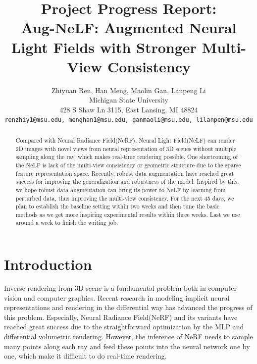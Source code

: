 \documentclass[10pt,twocolumn,letterpaper]{article}
\begin{document}
\title{Project Progress Report: \\Aug-NeLF: Augmented Neural Light Fields with Stronger Multi-View Consistency}

\author{Zhiyuan Ren, Han Meng, Maolin Gan, Lanpeng Li\\
Michigan State University\\
428 S Shaw Ln 3115, East Lansing, MI 48824\\
{\tt\small renzhiy1@msu.edu, menghan1@msu.edu, ganmaoli@msu.edu, lilanpen@msu.edu}
}
\maketitle

\begin{abstract}
   Compared with Neural Radiance Field(NeRF), Neural Light Field(NeLF) can render 2D images with novel views from neural representation of 3D scenes without multiple sampling along the ray, which makes real-time rendering possible. One shortcoming of the NeLF is lack of the multi-view consistency or geometric structure due to the sparse feature representation space. Recently, robust data augmentation have reached great success for improving the generalization and robustness of the model. Inspired by this, we hope robust data augmentation can bring its power to NeLF by learning from perturbed data, thus improving the multi-view consistency. For the next 45 days, we plan to establish the baseline setting within two weeks and then tune the basic methods as we get more inspiring experimental results within three weeks. Last we use around a week to finish the writing job.
\end{abstract}

%  
\section{Introduction}
\label{sec:intro}
Inverse rendering from 3D scene is a fundamental problem both in computer vision and computer graphics. Recent research in modeling implicit neural representations \cite{dellaert2020neural, mescheder2019occupancy, park2019deepsdf, takikawa2021neural} and rendering in the differential way \cite{mildenhall2021nerf} has advanced the progress of this problem. Especially, Neural Radiance Field(NeRF) and its variants have reached great success due to the straightforward optimization by the MLP and differential volumetric rendering. However, the inference of NeRF needs to sample many points along each ray and feed these points into the neural network one by one, which make it difficult to do real-time rendering.
\end{document}
